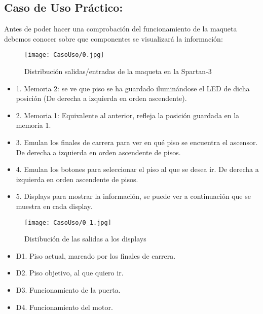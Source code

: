 \subsection{Caso de Uso Práctico:}
	
	Antes de poder hacer una comprobación del funcionamiento de la maqueta debemos conocer sobre que componentes se visualizará la información:
	
	\begin{figure}[H]
        \centering
        \texttt{[image: CasoUso/0.jpg]}
        \caption{Distribución salidas/entradas de la maqueta en la Spartan-3}
        \label{fig:Spartan3Interfaz}
    \end{figure}
    
    
    \begin{itemize}
	    \item 1. Memoria 2: se ve que piso se ha guardado iluminándose el LED de dicha posición (De derecha a izquierda en orden ascendente).
	    \item 2. Memoria 1: Equivalente al anterior, refleja la posición guardada en la memoria 1.
	    \item 3. Emulan los finales de carrera para ver en qué piso se encuentra el ascensor. De derecha a izquierda en orden ascendente de pisos.
	    \item 4. Emulan los botones para seleccionar el piso al que se desea ir. De derecha a izquierda en orden ascendente de pisos.
	    \item 5. Displays para mostrar la información, se puede ver a continuación que se muestra en cada display.
	\end{itemize} 
	
	\begin{figure}[H]
        \centering
        \texttt{[image: CasoUso/0\_1.jpg]}
        \caption{Distibución de las salidas a los displays}
        \label{fig:Spartan3InterfazDisplays}
    \end{figure}
    
    \begin{itemize}
		    \item  D1. Piso actual, marcado por los finales de carrera.
		    \item  D2. Piso objetivo, al que quiero ir.
		    \item  D3. Funcionamiento de la puerta.
		    \item  D4. Funcionamiento del motor.
	\end{itemize} 
	
